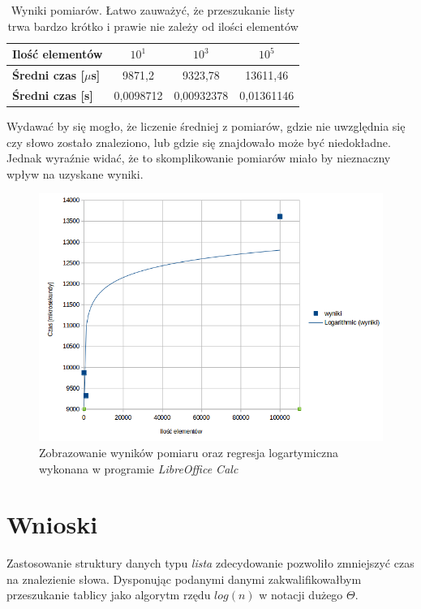 \documentclass[11pt,a4paper]{article}
\begin{document}
\begin{table}[h]
\begin{center}

\begin{tabular}{|l|c|c|c|}
	\hline
	\textbf{Ilość elementów} & $10^1$ & $10^3$ & $10^5$ \\ \hline
	\textbf{Średni czas [$\mu$s]} & 9871,2 & 9323,78 & 13611,46 \\ \hline
    \textbf{Średni czas [s]} & 0,0098712	& 0,00932378	 & 0,01361146 \\ \hline


\end{tabular}

\end{center}
\caption{Wyniki pomiarów. Łatwo zauważyć, że przeszukanie listy trwa bardzo krótko i prawie nie zależy od ilości elementów}
\end{table}

\bigskip
\bigskip
\bigskip

Wydawać by się mogło, że liczenie średniej z pomiarów, gdzie nie uwzględnia się czy słowo zostało znaleziono, lub gdzie się znajdowało może być niedokładne. Jednak wyraźnie widać, że to skomplikowanie pomiarów miało by nieznaczny wpływ na uzyskane wyniki.

\begin{figure}[h]

\begin{center}
	\includegraphics[scale=0.6]{../wyniki/wyniki_przeszukania.png}
\end{center}
\caption{Zobrazowanie wyników pomiaru oraz regresja logartymiczna wykonana w programie \textit{LibreOffice Calc}}
\end{figure}
\newpage
\section{Wnioski}
\hspace{4ex}Zastosowanie struktury danych typu \textit{lista} zdecydowanie pozwoliło zmniejszyć czas na znalezienie słowa. Dysponując podanymi danymi zakwalifikowałbym przeszukanie tablicy jako algorytm rzędu $log(n)$ w notacji dużego $\Theta$.
\end{document}
